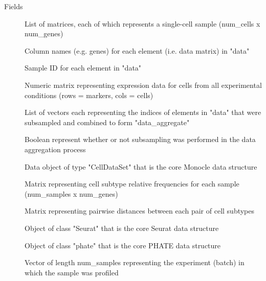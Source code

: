 \documentclass[a4paper]{book}
\begin{document}
%
\begin{Section}{Fields}

\begin{description}

\item[] List of matrices, each of which represents a single-cell sample (num\_cells x num\_genes)

\item[] Column names (e.g. genes) for each element (i.e. data matrix) in "data"

\item[] Sample ID for each element in "data"

\item[] Numeric matrix representing expression data for cells from all experimental conditions (rows = markers, cols = cells)

\item[] List of vectors each representing the indices of elements in "data" that were subsampled and combined to form "data\_aggregate"

\item[] Boolean represent whether or not subsampling was performed in the data aggregation process

\item[] Data object of type "CellDataSet" that is the core Monocle data structure

\item[] Matrix representing cell subtype relative frequencies for each sample (num\_samples x num\_genes)

\item[] Matrix representing pairwise distances between each pair of cell subtypes

\item[] Object of class "Seurat" that is the core Seurat data structure

\item[] Object of class "phate" that is the core PHATE data structure

\item[] Vector of length num\_samples representing the experiment (batch) in which the sample was profiled

\end{description}
\end{Section}
\end{document}
